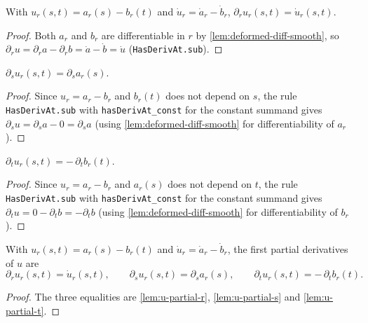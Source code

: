 \begin{lemma}
    \label{lem:u-partial-r}
    With $u_r(s,t)=a_r(s)-b_r(t)$ and $\dot u_r=\dot a_r-\dot b_r$,
    $\partial_r u_r(s,t)=\dot u_r(s,t)$.
\end{lemma}
\begin{proof}
    Both $a_r$ and $b_r$ are differentiable in $r$ by \cref{lem:deformed-diff-smooth},
    so $\partial_r u=\partial_r a-\partial_r b=\dot a-\dot b=\dot u$
    (\texttt{HasDerivAt.sub}).
\end{proof}

\begin{lemma}
    \label{lem:u-partial-s}
    $\partial_s u_r(s,t)=\partial_s a_r(s)$.
\end{lemma}
\begin{proof}
    Since $u_r=a_r-b_r$ and $b_r(t)$ does not depend on $s$, the rule
    \texttt{HasDerivAt.sub} with \texttt{hasDerivAt\_const} for the constant summand
    gives $\partial_s u=\partial_s a-0=\partial_s a$ (using
    \cref{lem:deformed-diff-smooth} for differentiability of $a_r$).
\end{proof}

\begin{lemma}
    \label{lem:u-partial-t}
    $\partial_t u_r(s,t)=-\,\partial_t b_r(t)$.
\end{lemma}
\begin{proof}
    Since $u_r=a_r-b_r$ and $a_r(s)$ does not depend on $t$, the rule
    \texttt{HasDerivAt.sub} with \texttt{hasDerivAt\_const} for the constant summand
    gives $\partial_t u=0-\partial_t b=-\partial_t b$ (using
    \cref{lem:deformed-diff-smooth} for differentiability of $b_r$).
\end{proof}

\begin{lemma}
    \label{lem:u-partials}
    With $u_r(s,t)=a_r(s)-b_r(t)$ and $\dot u_r=\dot a_r-\dot b_r$, the first partial
    derivatives of $u$ are
    \[
        \partial_r u_r(s,t)=\dot u_r(s,t),\qquad
        \partial_s u_r(s,t)=\partial_s a_r(s),\qquad
        \partial_t u_r(s,t)=-\,\partial_t b_r(t).
    \]
\end{lemma}
\begin{proof}
    The three equalities are \cref{lem:u-partial-r}, \cref{lem:u-partial-s} and
    \cref{lem:u-partial-t}.
\end{proof}

